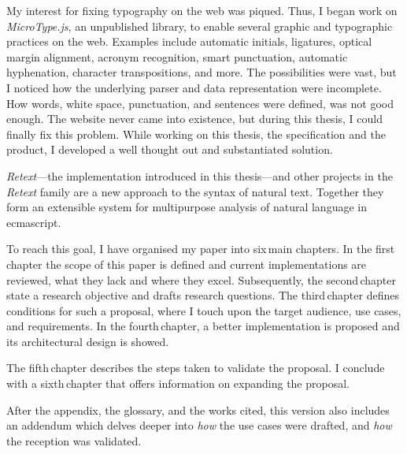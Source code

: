 My interest for fixing typography on the web was piqued.
Thus, I began work on \emph{MicroType.js}, an unpublished library, to
  enable several graphic and typographic practices on the web.
Examples include automatic initials, ligatures, optical margin alignment,
  acronym recognition, smart punctuation, automatic hyphenation, character
  transpositions, and more.
The possibilities were vast, but I noticed how the underlying parser and data
  representation were incomplete.
How words, white space, punctuation, and sentences were defined, was not
  good enough.
The website never came into existence, but during this thesis, I could
  finally fix this problem.
While working on this thesis, the specification and the product, I developed
  a well thought out and substantiated solution.

\emph{Retext}---the implementation introduced in this thesis---and other
  projects in the \emph{Retext} family are a new approach to the syntax of
  natural text.
Together they form an extensible system for multipurpose analysis of natural
  language in \gls{ecmascript}.

To reach this goal, I have organised my paper into six\,main chapters.
In the first\,chapter the scope of this paper is defined and current
  implementations are reviewed, what they lack and where they excel.
Subsequently, the second\,chapter state a research objective and drafts
  research questions.
The third\,chapter defines conditions for such a proposal, where I touch
  upon the target audience, use cases, and requirements.
In the fourth\,chapter, a better implementation is proposed and its
  architectural design is showed.

The fifth\,chapter describes the steps taken to validate the proposal.
I conclude with a sixth\,chapter that offers information on expanding the
  proposal.

After the appendix, the glossary, and the works cited, this version also
  includes an addendum which delves deeper into \emph{how} the use cases were
  drafted, and \emph{how} the reception was validated.

\endgroup
